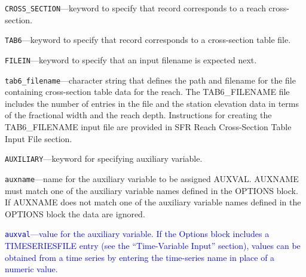 \begin{description}
\item \texttt{CROSS\_SECTION}---keyword to specify that record corresponds to a reach cross-section.

\item \texttt{TAB6}---keyword to specify that record corresponds to a cross-section table file.

\item \texttt{FILEIN}---keyword to specify that an input filename is expected next.

\item \texttt{tab6\_filename}---character string that defines the path and filename for the file containing cross-section table data for the reach. The TAB6\_FILENAME file includes the number of entries in the file and the station elevation data in terms of the fractional width and the reach depth. Instructions for creating the TAB6\_FILENAME input file are provided in SFR Reach Cross-Section Table Input File section.

\item \texttt{AUXILIARY}---keyword for specifying auxiliary variable.

\item \texttt{auxname}---name for the auxiliary variable to be assigned AUXVAL.  AUXNAME must match one of the auxiliary variable names defined in the OPTIONS block. If AUXNAME does not match one of the auxiliary variable names defined in the OPTIONS block the data are ignored.

\item \textcolor{blue}{\texttt{auxval}---value for the auxiliary variable.  If the Options block includes a TIMESERIESFILE entry (see the ``Time-Variable Input'' section), values can be obtained from a time series by entering the time-series name in place of a numeric value.}

\end{description}


